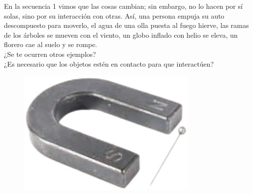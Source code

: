 \documentclass[11pt]{book}
\begin{document}
En la secuencia 1 vimos que las cosas cambian; sin embargo, no lo hacen por sí solas,
sino por su interacción con otras. Así, una persona empuja su auto descompuesto para
moverlo, el agua de una olla puesta al fuego hierve, las ramas de los árboles se mueven
con el viento, un globo inflado con helio se eleva, un florero cae al suelo y se rompe.\\

¿Se te ocurren otros ejemplos?\\
¿Es necesario que los objetos estén en contacto para que interactúen?\\

\begin{minipage}[t]{0.35\textwidth}
    \begin{figure}[H]
        \centering
        \includegraphics[width=\linewidth]{f_magnetica}
        \label{fig:f_magnetica}
    \end{figure}
    \begin{figure}[H]
        \centering

\end{figure}
\end{minipage}
\end{document}
